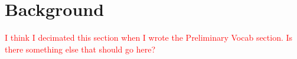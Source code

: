 \chapter{Background}
\label{background}

\textcolor{Red}{I think I decimated this section when I wrote the Preliminary Vocab section.  Is there something else that should go here?}
